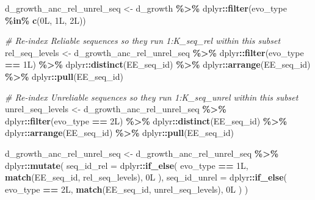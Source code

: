 \documentclass[
]{article}
\newenvironment{Shaded}{\begin{snugshade}}{\end{snugshade}}
\newcommand{\AttributeTok}[1]{\textcolor[rgb]{0.13,0.29,0.53}{#1}}
\newcommand{\CommentTok}[1]{\textcolor[rgb]{0.56,0.35,0.01}{\textit{#1}}}
\newcommand{\DataTypeTok}[1]{\textcolor[rgb]{0.13,0.29,0.53}{#1}}
\newcommand{\DecValTok}[1]{\textcolor[rgb]{0.00,0.00,0.81}{#1}}
\newcommand{\FunctionTok}[1]{\textcolor[rgb]{0.13,0.29,0.53}{\textbf{#1}}}
\newcommand{\NormalTok}[1]{#1}
\newcommand{\OtherTok}[1]{\textcolor[rgb]{0.56,0.35,0.01}{#1}}
\newcommand{\SpecialCharTok}[1]{\textcolor[rgb]{0.81,0.36,0.00}{\textbf{#1}}}
\begin{document}
\begin{Shaded}
\begin{Highlighting}[]
\NormalTok{d\_growth\_anc\_rel\_unrel\_seq }\OtherTok{\textless{}{-}}\NormalTok{ d\_growth }\SpecialCharTok{\%\textgreater{}\%}
\NormalTok{  dplyr}\SpecialCharTok{::}\FunctionTok{filter}\NormalTok{(evo\_type }\SpecialCharTok{\%in\%} \FunctionTok{c}\NormalTok{(}\DecValTok{0}\DataTypeTok{L}\NormalTok{, }\DecValTok{1}\DataTypeTok{L}\NormalTok{, }\DecValTok{2}\DataTypeTok{L}\NormalTok{))}

\CommentTok{\# Re{-}index Reliable sequences so they run 1:K\_seq\_rel within this subset}
\NormalTok{rel\_seq\_levels }\OtherTok{\textless{}{-}}\NormalTok{ d\_growth\_anc\_rel\_unrel\_seq }\SpecialCharTok{\%\textgreater{}\%}
\NormalTok{  dplyr}\SpecialCharTok{::}\FunctionTok{filter}\NormalTok{(evo\_type }\SpecialCharTok{==} \DecValTok{1}\DataTypeTok{L}\NormalTok{) }\SpecialCharTok{\%\textgreater{}\%}
\NormalTok{  dplyr}\SpecialCharTok{::}\FunctionTok{distinct}\NormalTok{(EE\_seq\_id) }\SpecialCharTok{\%\textgreater{}\%}
\NormalTok{  dplyr}\SpecialCharTok{::}\FunctionTok{arrange}\NormalTok{(EE\_seq\_id) }\SpecialCharTok{\%\textgreater{}\%}
\NormalTok{  dplyr}\SpecialCharTok{::}\FunctionTok{pull}\NormalTok{(EE\_seq\_id)}

\CommentTok{\# Re{-}index Unreliable sequences so they run 1:K\_seq\_unrel within this subset}
\NormalTok{unrel\_seq\_levels }\OtherTok{\textless{}{-}}\NormalTok{ d\_growth\_anc\_rel\_unrel\_seq }\SpecialCharTok{\%\textgreater{}\%}
\NormalTok{  dplyr}\SpecialCharTok{::}\FunctionTok{filter}\NormalTok{(evo\_type }\SpecialCharTok{==} \DecValTok{2}\DataTypeTok{L}\NormalTok{) }\SpecialCharTok{\%\textgreater{}\%}
\NormalTok{  dplyr}\SpecialCharTok{::}\FunctionTok{distinct}\NormalTok{(EE\_seq\_id) }\SpecialCharTok{\%\textgreater{}\%}
\NormalTok{  dplyr}\SpecialCharTok{::}\FunctionTok{arrange}\NormalTok{(EE\_seq\_id) }\SpecialCharTok{\%\textgreater{}\%}
\NormalTok{  dplyr}\SpecialCharTok{::}\FunctionTok{pull}\NormalTok{(EE\_seq\_id)}

\NormalTok{d\_growth\_anc\_rel\_unrel\_seq }\OtherTok{\textless{}{-}}\NormalTok{ d\_growth\_anc\_rel\_unrel\_seq }\SpecialCharTok{\%\textgreater{}\%}
\NormalTok{  dplyr}\SpecialCharTok{::}\FunctionTok{mutate}\NormalTok{(}
    \AttributeTok{seq\_id\_rel =}\NormalTok{ dplyr}\SpecialCharTok{::}\FunctionTok{if\_else}\NormalTok{(}
\NormalTok{      evo\_type }\SpecialCharTok{==} \DecValTok{1}\DataTypeTok{L}\NormalTok{,}
      \FunctionTok{match}\NormalTok{(EE\_seq\_id, rel\_seq\_levels),}
      \DecValTok{0}\DataTypeTok{L}
\NormalTok{    ),}
    \AttributeTok{seq\_id\_unrel =}\NormalTok{ dplyr}\SpecialCharTok{::}\FunctionTok{if\_else}\NormalTok{(}
\NormalTok{      evo\_type }\SpecialCharTok{==} \DecValTok{2}\DataTypeTok{L}\NormalTok{,}
      \FunctionTok{match}\NormalTok{(EE\_seq\_id, unrel\_seq\_levels),}
      \DecValTok{0}\DataTypeTok{L}
\NormalTok{    )}
\NormalTok{  )}


\end{Highlighting}
\end{Shaded}
\end{document}
